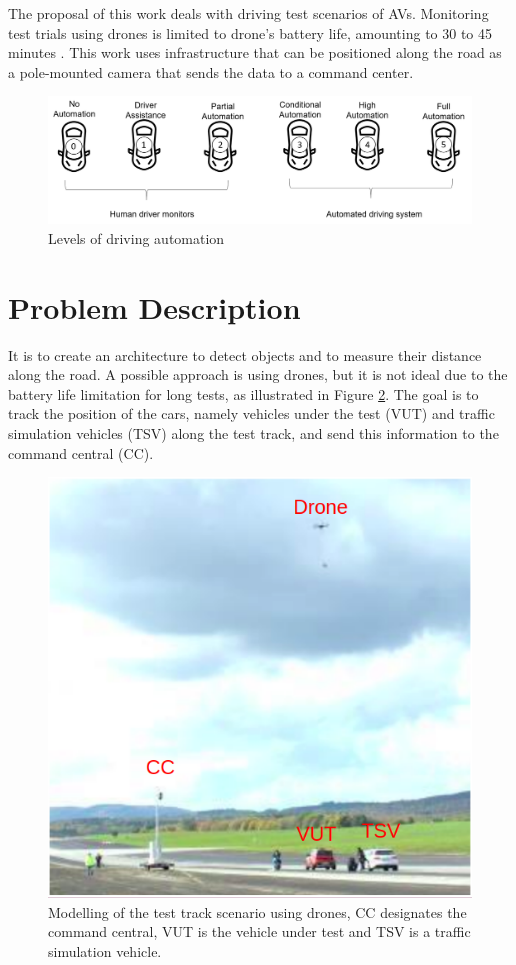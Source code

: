 The proposal of this work deals with driving test scenarios of AVs. Monitoring test trials using drones is limited to drone's battery life, amounting to 30 to 45 minutes \cite{9138314}. This work uses infrastructure that can be positioned along the road as a pole-mounted camera that sends the data to a command center.

\begin{figure}[H]
\centering
\includegraphics[scale=0.6]{imagens/Levels.png}
\caption{Levels of driving automation}
\label{fig:automation}
\end{figure}

\section{Problem Description}

It is to create an architecture to detect objects and to measure their distance along the road. A possible approach is using drones, but it is not ideal due to the battery life limitation for long tests, as illustrated in Figure \ref{fig:tests}. The goal is to track the position of the cars, namely vehicles under the test (VUT) and traffic simulation vehicles (TSV) along the test track, and send this information to the command central (CC). 

\begin{figure}[H]
\centering
\includegraphics[scale=0.55]{imagens/proposal.png}
\caption{Modelling of the test track scenario using drones, CC designates the command central, VUT is the vehicle under test and TSV is a traffic simulation vehicle.}
\label{fig:tests}
\end{figure}

